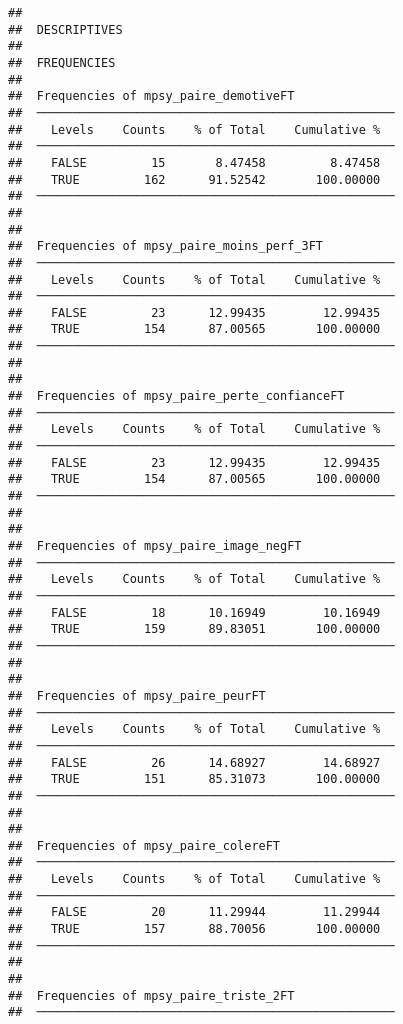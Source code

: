 \documentclass[
]{article}
\begin{document}
\begin{verbatim}
## 
##  DESCRIPTIVES
## 
##  FREQUENCIES
## 
##  Frequencies of mpsy_paire_demotiveFT               
##  ────────────────────────────────────────────────── 
##    Levels    Counts    % of Total    Cumulative %   
##  ────────────────────────────────────────────────── 
##    FALSE         15       8.47458         8.47458   
##    TRUE         162      91.52542       100.00000   
##  ────────────────────────────────────────────────── 
## 
## 
##  Frequencies of mpsy_paire_moins_perf_3FT           
##  ────────────────────────────────────────────────── 
##    Levels    Counts    % of Total    Cumulative %   
##  ────────────────────────────────────────────────── 
##    FALSE         23      12.99435        12.99435   
##    TRUE         154      87.00565       100.00000   
##  ────────────────────────────────────────────────── 
## 
## 
##  Frequencies of mpsy_paire_perte_confianceFT        
##  ────────────────────────────────────────────────── 
##    Levels    Counts    % of Total    Cumulative %   
##  ────────────────────────────────────────────────── 
##    FALSE         23      12.99435        12.99435   
##    TRUE         154      87.00565       100.00000   
##  ────────────────────────────────────────────────── 
## 
## 
##  Frequencies of mpsy_paire_image_negFT              
##  ────────────────────────────────────────────────── 
##    Levels    Counts    % of Total    Cumulative %   
##  ────────────────────────────────────────────────── 
##    FALSE         18      10.16949        10.16949   
##    TRUE         159      89.83051       100.00000   
##  ────────────────────────────────────────────────── 
## 
## 
##  Frequencies of mpsy_paire_peurFT                   
##  ────────────────────────────────────────────────── 
##    Levels    Counts    % of Total    Cumulative %   
##  ────────────────────────────────────────────────── 
##    FALSE         26      14.68927        14.68927   
##    TRUE         151      85.31073       100.00000   
##  ────────────────────────────────────────────────── 
## 
## 
##  Frequencies of mpsy_paire_colereFT                 
##  ────────────────────────────────────────────────── 
##    Levels    Counts    % of Total    Cumulative %   
##  ────────────────────────────────────────────────── 
##    FALSE         20      11.29944        11.29944   
##    TRUE         157      88.70056       100.00000   
##  ────────────────────────────────────────────────── 
## 
## 
##  Frequencies of mpsy_paire_triste_2FT               
##  ────────────────────────────────────────────────── 

\end{verbatim}
\end{document}
